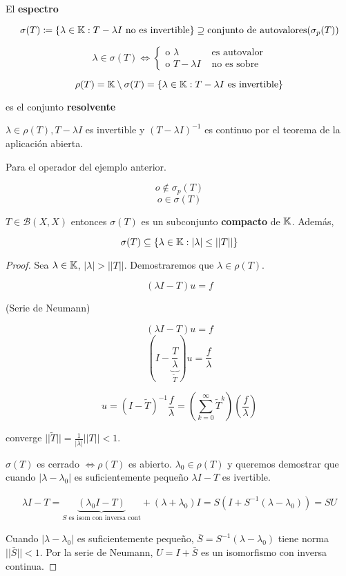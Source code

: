 \begin{fdefinition}
   El \textbf{espectro}

   \[\sigma(T)\coloneqq \{\lambda\in \mathbb{K}:T-\lambda I\text{ no es invertible}\}\supseteq \text{conjunto de autovalores}(\sigma_p(T))\]

   \[\lambda\in \sigma(T)\iff \begin{cases}
      \text{o }\lambda&\text{ es autovalor}\\
      \text{o }T-\lambda I&\text{ no es sobre}
   \end{cases}\]

   \[\rho(T)=\mathbb{K}\setminus\sigma(T)=\{\lambda\in\mathbb{K}:T-\lambda I\text{ es invertible}\}\]

   es el conjunto \textbf{resolvente}
\end{fdefinition}

$\lambda\in\rho(T),T-\lambda I$ es invertible y $(T-\lambda I)^{-1}$ es continuo por el teorema de la aplicación abierta.

\begin{fexample}
   Para el operador del ejemplo anterior.

   \[o\notin \sigma_p(T)\]
   \[o\in \sigma(T)\]
\end{fexample}

\begin{ftheorem}
   $T\in \mathcal{B}(X,X)$ entonces $\sigma(T)$ es un subconjunto \textbf{compacto} de $\mathbb{K}$. Además,

   \[\sigma(T)\subseteq \{\lambda\in\mathbb{K}:|\lambda|\leq ||T||\}\]
\end{ftheorem}

\begin{proof}
   Sea $\lambda\in\mathbb{K}$, $|\lambda|>||T||$. Demostraremos que $\lambda\in\rho(T)$.

   \[(\lambda I-T)u=f\]

   (Serie de Neumann)

   \[(\lambda I-T)u=f\]
   \[\left(I-\underbrace{\frac{T}{\lambda}}_{\tilde T}\right)u=\frac{f}{\lambda}\]

   \[u=(I-\tilde T)^{-1}\frac{f}{\lambda}=\left(\sum_{k=0}^\infty \tilde T^k\right)\left(\frac{f}{\lambda}\right)\]

   converge $||\tilde T||=\frac{1}{|\lambda|}||T||<1$.

   $\sigma(T)$ es cerrado $\iff\rho(T)$ es abierto. $\lambda_0\in \rho(T)$ y queremos demostrar que cuando $|\lambda-\lambda_0|$ es suficientemente pequeño $\lambda I-T$ es ivertible.

   \begin{align*}
      \lambda I-T=\underbrace{(\lambda_0I-T)}_{S \text{ es isom con inversa cont}}+(\lambda+\lambda_0)I=S(I+S^{-1}(\lambda-\lambda_0))=SU
   \end{align*}

   Cuando $|\lambda-\lambda_0|$ es suficientemente pequeño, $\bar S=S^{-1}(\lambda-\lambda_0)$ tiene norma $||\bar S||<1$. Por la serie de Neumann, $U=I+\bar S$ es un isomorfismo con inversa continua.
\end{proof}

